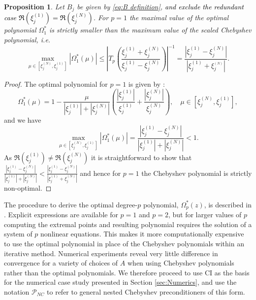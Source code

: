 \documentclass{article}
\newtheorem{prop}{Proposition}
\newcommand{\jt}{\textcolor{black}}%
\newcommand{\sizeA}{N}
\theoremstyle{definition}
\newcommand{\poly}{\Omega}
\begin{document}
{		\begin{prop}
			Let $B_j$ be given by \eqref{eq:B definition}, \jt{and exclude the redundant case $\Re(\xi_j^{(1)}) = \Re(\xi_j^{(N)})$}. For $p=1$ the maximal value of the optimal polynomial $\poly^*_1$ is strictly smaller than the maximum value of the scaled Chebyshev polynomial, i.e.
			$$
			\max_{\mu \in [\xi_j^{(\sizeA)},\xi_j^{(1)}]}| \poly_1^{\ast}(\mu) |\le {\left| T_p \left(\frac{\xi_j^{(1)}+\xi_j^{(N)}}{\xi_j^{(1)}-\xi_j^{(N)}}\right) \right|}^{-1} = \frac{|\xi_j^{(1)}-\xi_j^{(N)}|}{|\xi_j^{(1)}+\xi_j^{_(N)}|}.
			$$
		\end{prop}
		\begin{proof}
			The optimal polynomial for $p=1$ is given by \cite[Example 5.1, p.\,357]{opfer1984richardson}:
			\begin{equation*}
				\label{opt_pol_OS84_p1}
				\poly_1^{\ast}(\mu) = 1 - \frac{\mu}{|\xi_j^{(1)}| + |\xi_j^{(N)}| } \left( \frac{| \xi_j^{(1)} |}{\xi_j^{(1)}} +  \frac{|\xi_j^{(N)}|}{\xi_j^{(N)}}  \right), \quad \mu \in [\xi_j^{(N)},\xi_j^{(1)}],
			\end{equation*}
			and we have \cite[Eq. (5.6), p.\,358]{opfer1984richardson}
			$$
			\max_{\mu \in [\xi_j^{(N)},\xi_j^{(1)}]} | \poly_1^{\ast}(\mu) | = \frac{| \xi_j^{(1)}-\xi_j^{(N)}| }{ |\xi_j^{(1)}| + | \xi_j^{(N)}|  } < 1. 
			$$
			As $\Re(\xi_j^{(1)})\ne\Re(\xi_j^{(N)})$ it is straightforward to show that $\frac{| \xi_j^{(1)}-\xi_j^{(N)}| }{ |\xi_j^{(1)}| + | \xi_j^{(N)}|  } < \frac{|\xi_j^{(1)}-\xi_j^{(N)}|}{|\xi_j^{(1)}+\xi_j^{(N)}|}$ and hence for $p=1$ the Chebyshev polynomial is strictly non-optimal.
		\end{proof}
		
		
		The procedure to derive the optimal degree-$p$ polynomial, $\poly^\ast_p(z)$, is described in \cite[Corollary to Theorem 3.5]{freund1986class}.  Explicit expressions are available for $p=1$ and $p=2$, but for larger values of $p$ computing the extremal points and resulting polynomial requires the solution of a system of $p$ {nonlinear equations}.  This makes it more computationally expensive to use the optimal polynomial in place of the Chebyshev polynomials within an iterative method. Numerical experiments reveal very little difference in convergence for a  variety of choices of $A$ when using Chebyshev polynomials rather than the optimal polynomials. We therefore proceed to use CI as the basis for the numerical case study presented in Section \ref{sec:Numerics}, and use the notation $\mathcal{P}_{NC}$ to refer to general nested Chebyshev preconditioners of this form.
		
}
\end{document}

